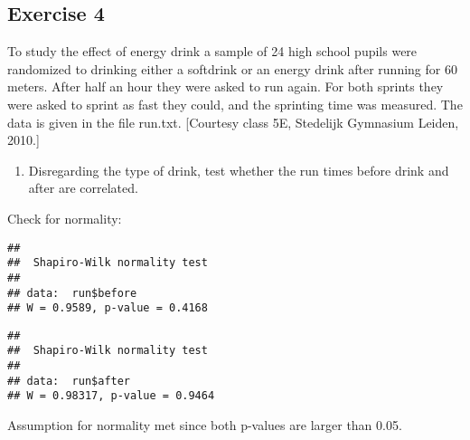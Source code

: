 \documentclass[
]{article}
\newenvironment{Shaded}{\begin{snugshade}}{\end{snugshade}}
\newcommand{\AttributeTok}[1]{\textcolor[rgb]{0.77,0.63,0.00}{#1}}
\newcommand{\CommentTok}[1]{\textcolor[rgb]{0.56,0.35,0.01}{\textit{#1}}}
\newcommand{\FunctionTok}[1]{\textcolor[rgb]{0.00,0.00,0.00}{#1}}
\newcommand{\NormalTok}[1]{#1}
\newcommand{\SpecialCharTok}[1]{\textcolor[rgb]{0.00,0.00,0.00}{#1}}
\newcommand{\StringTok}[1]{\textcolor[rgb]{0.31,0.60,0.02}{#1}}
\providecommand{\tightlist}{%
  \setlength{\itemsep}{0pt}\setlength{\parskip}{0pt}}
\begin{document}
\hypertarget{exercise-4}{%
\subsection{Exercise 4}\label{exercise-4}}

To study the effect of energy drink a sample of 24 high school pupils
were randomized to drinking either a softdrink or an energy drink after
running for 60 meters. After half an hour they were asked to run again.
For both sprints they were asked to sprint as fast they could, and the
sprinting time was measured. The data is given in the file run.txt.
{[}Courtesy class 5E, Stedelijk Gymnasium Leiden, 2010.{]}

\begin{enumerate}
\def\labelenumi{\alph{enumi})}
\tightlist
\item
  Disregarding the type of drink, test whether the run times before
  drink and after are correlated.
\end{enumerate}

Check for normality:

\begin{Shaded}
\end{Shaded}

\begin{verbatim}
## 
##  Shapiro-Wilk normality test
## 
## data:  run$before
## W = 0.9589, p-value = 0.4168
\end{verbatim}

\begin{Shaded}
\end{Shaded}

\begin{verbatim}
## 
##  Shapiro-Wilk normality test
## 
## data:  run$after
## W = 0.98317, p-value = 0.9464
\end{verbatim}

Assumption for normality met since both p-values are larger than 0.05.

\begin{Shaded}
\end{Shaded}
\end{document}
